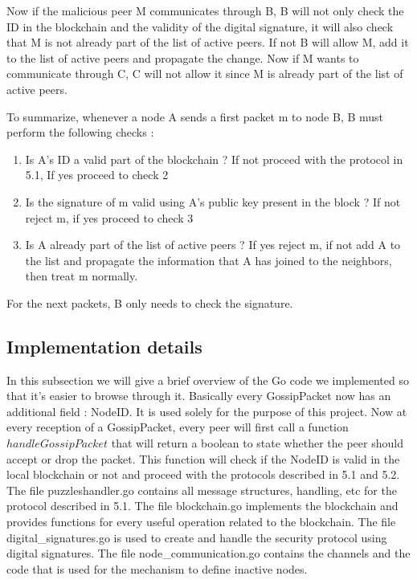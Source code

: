 \documentclass[twocolumn]{article}
\begin{document}
Now if the malicious peer M communicates through B, B will not only check the ID in the blockchain and the validity of the digital signature, it will also check that M is not already part of the list of active peers. If not B will allow M, add it to the list of active peers and propagate the change. Now if M wants to communicate through C, C  will not allow it since M is already part of the list of active peers.

To summarize, whenever a node A sends a first packet m to node B, B must perform the following checks :
\begin{enumerate}
	\item Is A’s ID  a valid part of the blockchain ? If not proceed with the protocol in 5.1, If yes proceed to check 2
	\item Is the signature of m valid using A’s public key present in the block ? If not reject m, if yes proceed to check 3
	\item Is A already part of the list of active peers ? If yes reject m, if not add A to the list and propagate the information that A has joined to the neighbors, then treat m normally.
\end{enumerate}


For the next packets, B only needs to check the signature.

\subsection{Implementation details}
In this subsection we will give a brief overview of the Go code we implemented so that it's easier to browse through it. Basically every GossipPacket now has an additional field : NodeID. It is used solely for the purpose of this project. Now at every reception of a GossipPacket, every peer will first call a function $handleGossipPacket$ that will return a boolean to state whether the peer should accept or drop the packet. This function will check if the NodeID is valid in the local blockchain or not and proceed with the protocols described in 5.1 and 5.2. The file puzzleshandler.go contains all message structures, handling, etc for the protocol described in 5.1. The file blockchain.go implements the blockchain and provides functions for every useful operation related to the blockchain. The file digital\_signatures.go is used to create and handle the security protocol using digital signatures. The file node\_communication.go contains the channels and the code that is used for the mechanism to define inactive nodes.
\end{document}

